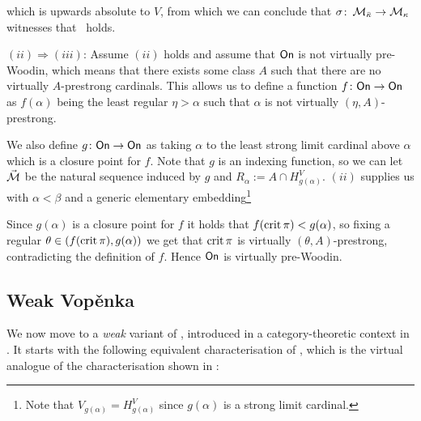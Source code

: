 \documentclass[../../main]{subfiles}
\begin{document}
{  which is upwards absolute to $V$, from which we can conclude that $\sigma\colon\operatorname{\mathcal M}_{\bar\kappa}\to\operatorname{\mathcal M}_\kappa$ witnesses that \gvp\ holds.

  

  \qquad $(ii)\Rightarrow(iii)$: Assume $(ii)$ holds and assume that $\textsf{On}$ is not virtually pre-Woodin, which means that there exists some class $A$ such that there are no virtually $A$-prestrong cardinals. This allows us to define a function $f\colon\textsf{On}\to\textsf{On}$ as $f(\alpha)$ being the least regular $\eta>\alpha$ such that $\alpha$ is not virtually $(\eta,A)$-prestrong.

  \qquad We also define $g\colon\textsf{On}\to\textsf{On}$ as taking $\alpha$ to the least strong limit cardinal above $\alpha$ which is a closure point for $f$. Note that $g$ is an indexing function, so we can let $\vec{\operatorname{\mathcal M}}$ be the natural sequence induced by $g$ and $R_\alpha := A\cap H_{g(\alpha)}^V$. $(ii)$ supplies us with $\alpha<\beta$ and a generic elementary embedding\footnote{Note that $V_{g(\alpha)}=H_{g(\alpha)}^V$ since $g(\alpha)$ is a strong limit cardinal.}

  Since $g(\alpha)$ is a closure point for $f$ it holds that $f(\operatorname{crit}\pi)<g(\alpha)$, so fixing a regular $\theta\in(f(\operatorname{crit}\pi), g(\alpha))$ we get that $\operatorname{crit}\pi$ is virtually $(\theta, A)$-prestrong, contradicting the definition of $f$. Hence $\textsf{On}$ is virtually pre-Woodin.
}


\subsection{Weak Vop\v enka}

We now move to a \textit{weak} variant of \gvp, introduced in a category-theoretic context in \cite{AdamekRosicky}. It starts with the following equivalent characterisation of \gvp, which is the virtual analogue of the characterisation shown in \cite{AdamekRosicky}:
\end{document}

